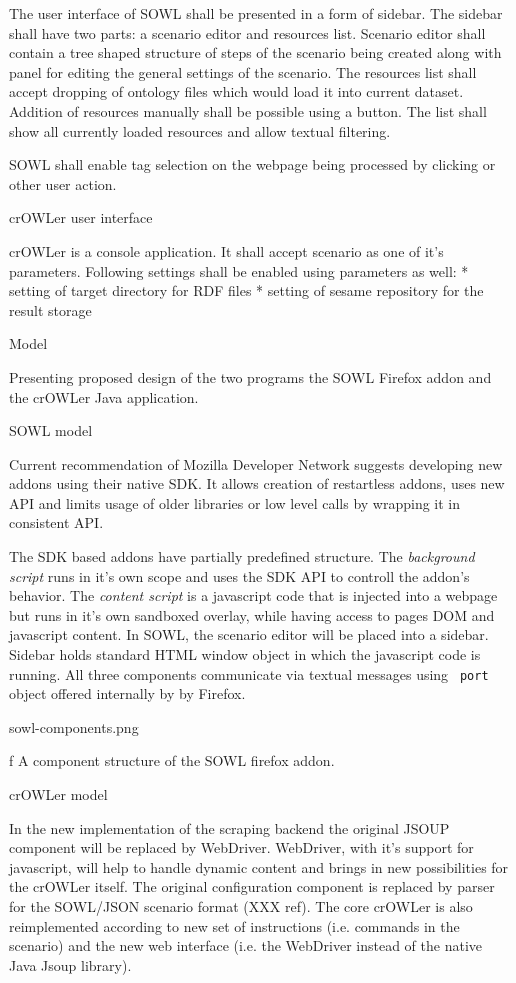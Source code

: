 The user interface of SOWL shall be presented in a form of sidebar. The sidebar
shall have two parts: a scenario editor and resources list. Scenario editor
shall contain a tree shaped structure of steps of the scenario being created
along with panel for editing the general settings of the scenario. The
resources list shall accept dropping of ontology files which would load it into
current dataset. Addition of resources manually shall be possible using a
button. The list shall show all currently loaded resources and allow textual
filtering. 

SOWL shall enable tag selection on the webpage being processed by clicking or
other user action. 


\secc crOWLer user interface

crOWLer is a console application. It shall accept scenario as one of it's parameters. 
Following settings shall be enabled using parameters as well:
\begitems
  * setting of target directory for RDF files
  * setting of sesame repository for the result storage
\enditems


\sec Model

Presenting proposed design of the two programs the SOWL Firefox addon and the
crOWLer Java application. 

\secc SOWL model

Current recommendation of Mozilla Developer Network suggests developing new
addons using their native SDK. It allows creation of restartless addons, uses 
new API and limits usage of older libraries or low level calls by wrapping it 
in consistent API. 

The SDK based addons have partially predefined structure. The {\em background script}
runs in it's own scope and uses the SDK API to controll the addon's behavior.
The {\em content script} is a javascript code that is injected into a webpage
but runs in it's own sandboxed overlay, while having access to pages DOM and
javascript content. In SOWL, the scenario editor will be placed into a sidebar.
Sidebar holds standard HTML window object in which the javascript code is
running.  All three components communicate via textual messages using {\tt
port} object offered internally by by Firefox. 

\midinsert
\picw=12.5cm \cinspic sowl-components.png
\caption/f A component structure of the SOWL firefox addon. 
\endinsert


\secc crOWLer model

In the new implementation of the scraping backend the original JSOUP component
will be replaced by WebDriver. WebDriver, with it's support for javascript,
will help to handle dynamic content and brings in new possibilities for the
crOWLer itself. The original configuration component is replaced by parser for
the SOWL/JSON scenario format (XXX ref).  The core crOWLer is also
reimplemented according to new set of instructions (i.e. commands in the
scenario) and the new web interface (i.e. the WebDriver instead of the native
Java Jsoup library). 

